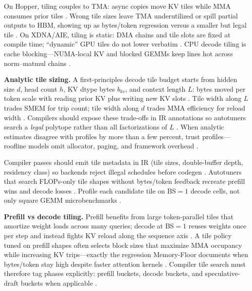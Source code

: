 On Hopper, tiling couples to TMA: async copies move KV tiles while MMA consumes prior tiles \citep{nvidia2022hopper,semianalysis2024tma}. Wrong tile sizes leave TMA underutilized or spill partial outputs to HBM, showing up as bytes/token regression versus a smaller but legal tile \citep{memoryfloor2026,yirage2026}. On XDNA/AIE, tiling is static: DMA chains and tile slots are fixed at compile time; ``dynamic'' GPU tiles do not lower verbatim \citep{amd2024xdna,amd2024aie,chen2020compilerbasedhardw}. CPU decode tiling is cache blocking---NUMA-local KV and blocked GEMMs keep lines hot across norm--matmul chains \citep{dlbook,kwon2023vllm}.

\textbf{Analytic tile sizing.} A first-principles decode tile budget starts from hidden size $d$, head count $h$, KV dtype bytes $b_{kv}$, and context length $L$: bytes moved per token scale with reading prior KV plus writing new KV slots \citep{kwon2023vllm,dao2022flashattention,patel2025llminference}. Tile width along $L$ trades SMEM for trip count; tile width along $d$ trades MMA efficiency for reload width \citep{dao2023flashdecoding,semianalysis2024tma,memoryfloor2026}. Compilers should expose these trade-offs in IR annotations so autotuners search a \emph{legal} polytope rather than all factorizations of $L$ \citep{yirage2026,chen2020compilerbasedhardw,taxbreak2026,dlbook}. When analytic estimates disagree with profiles by more than a few percent, trust profiles---roofline models omit allocator, paging, and framework overhead \citep{memoryfloor2026,patel2025llminference,taxbreak2026}.

Compiler passes should emit tile metadata in IR (tile sizes, double-buffer depth, residency class) so backends reject illegal schedules before codegen \citep{yirage2026,chen2020compilerbasedhardw,liu2024deepseekv3}. Autotuners that search FLOPs-only tile shapes without bytes/token feedback recreate prefill wins and decode losses \citep{patel2025llminference,taxbreak2026,memoryfloor2026}. Profile each candidate tile on BS${=}1$ decode cells, not only square GEMM microbenchmarks \citep{taxbreak2026,semianalysis2024tma}.

\textbf{Prefill vs decode tiling.} Prefill benefits from large token-parallel tiles that amortize weight loads across many queries; decode at BS${=}1$ reuses weights once per step and instead fights KV reload along the sequence axis \citep{dao2022flashattention,dao2023flashdecoding,patel2025llminference}. A tile policy tuned on prefill shapes often selects block sizes that maximize MMA occupancy while increasing KV trips---exactly the regression Memory-Floor documents when bytes/token stay high despite faster attention kernels \citep{memoryfloor2026,taxbreak2026}. Compiler tile search must therefore tag phases explicitly: prefill buckets, decode buckets, and speculative-draft buckets when applicable \citep{kwon2023vllm,yirage2026}.

